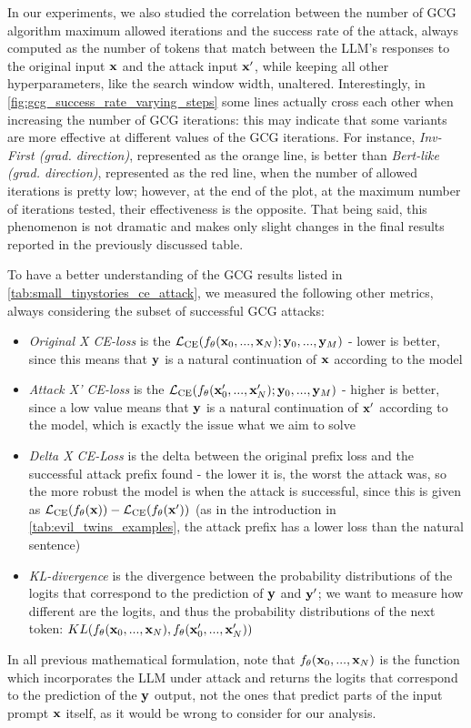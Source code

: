 \documentclass[../thesis.tex]{subfiles}
\begin{document}
In our experiments, we also studied the correlation between the number of GCG algorithm maximum allowed iterations and the success rate of the attack, always computed as the number of tokens that match between the LLM's responses to the original input $\mathbf{x}$ and the attack input $\mathbf{x}'$, while keeping all other hyperparameters, like the search window width, unaltered.
Interestingly, in \cref{fig:gcg_success_rate_varying_steps} some lines actually cross each other when increasing the number of GCG iterations: this may indicate that some variants are more effective at different values of the GCG iterations. For instance, \emph{Inv-First (grad. direction)}, represented as the orange line, is better than \emph{Bert-like (grad. direction)}, represented as the red line, when the number of allowed iterations is pretty low; however, at the end of the plot, at the maximum number of iterations tested, their effectiveness is the opposite. That being said, this phenomenon is not dramatic and makes only slight changes in the final results reported in the previously discussed table.

To have a better understanding of the GCG results listed in \cref{tab:small_tinystories_ce_attack},
we measured the following other metrics, always considering the subset of successful GCG attacks:
\begin{itemize}
    \item \emph{Original X CE-loss} is the $\mathcal{L}_\text{CE}(f_\theta(\mathbf{x}_0, ..., \mathbf{x}_N); \mathbf{y}_0, ..., \mathbf{y}_M)$ - lower is better, since this means that $\mathbf{y}$ is a natural continuation of $\mathbf{x}$ according to the model
    \item \emph{Attack X' CE-loss} is the $\mathcal{L}_\text{CE}(f_\theta(\mathbf{x}'_0, ..., \mathbf{x}'_N); \mathbf{y}_0, ..., \mathbf{y}_M)$ - higher is better, since a low value means that $\mathbf{y}$ is a natural continuation of $\mathbf{x}'$ according to the model, which is exactly the issue what we aim to solve
    \item \emph{Delta X CE-Loss} is the delta between the original prefix loss and the successful attack prefix found - the lower it is, the worst the attack was, so the more robust the model is when the attack is successful, since this is given as $\mathcal{L}_\text{CE}(f_\theta(\mathbf{x})) - \mathcal{L}_\text{CE}(f_\theta(\mathbf{x}'))$ (as in the introduction in \cref{tab:evil_twins_examples}, the attack prefix has a lower loss than the natural sentence)
    \item \emph{KL-divergence} is the divergence between the probability distributions of the logits that correspond to the prediction of $\mathbf{y}$ and $\mathbf{y}'$; we want to measure how different are the logits, and thus the probability distributions of the next token: $KL(f_\theta(\mathbf{x}_0, ..., \mathbf{x}_N), f_\theta(\mathbf{x}'_0, ..., \mathbf{x}'_N))$
\end{itemize}
In all previous mathematical formulation, note that $f_\theta(\mathbf{x}_0, ..., \mathbf{x}_N)$ is the function which incorporates the LLM under attack and returns the logits that correspond to the prediction of the $\mathbf{y}$ output, not the ones that predict parts of the input prompt $\mathbf{x}$ itself, as it would be wrong to consider for our analysis.
\end{document}
